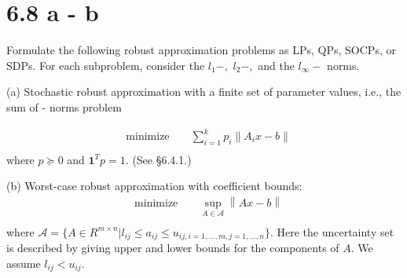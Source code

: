 \documentclass{article}
\begin{document}
\section*{6.8 a - b} %
Formulate the following robust approximation problems as LPs, QPs, SOCPs, or SDPs. For each subproblem, consider the $l_1 - ,$  $l_2 - ,$ and the $l_{\infty} - $ norms.

(a) Stochastic robust approximation with a finite set of parameter values, i.e., the sum of - norms problem

\begin{align*}
&\text{minimize } && 
\sum_{i = 1}^k
p_i\left\lVert A_ix - b\right\lVert  \\
\end{align*}
where $p \succeq 0$ and $\boldsymbol{1}^Tp = 1.$ 
(See \S6.4.1.)

(b) Worst-case robust approximation with coefficient bounds:
\begin{align*}
&\text{minimize } && 
\sup_{A \in \mathcal{A}}
\left\lVert Ax - b\right\lVert  \\
\end{align*}
where $\mathcal{A} = \{A \in R^{m\times n} | 
l_{ij} \leq a_{ij} \leq u_{ij, i = 1, ..., m, 
	j = 1, ... , n}\}.$ Here the uncertainty set is described by giving upper and lower bounds for the
components of $A$. We assume $l_{ij} < u_{ij}.$
\end{document}
